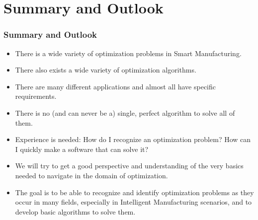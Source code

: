 \documentclass[mathserif]{beamer}%
\begin{document}
\section{Summary and Outlook}%
%
\begin{frame}%
\frametitle{Summary and Outlook}%
%
\begin{itemize}%
\item There is a wide variety of optimization problems in Smart Manufacturing.%
\item<2-> There also exists a wide variety of optimization algorithms.%
\item<3-> There are many different applications and almost all have specific requirements.%
\item<4-> There is no (and can never be a) single, perfect algorithm to solve all of them.\cite{WM1995NFLTFS,WM1997NFLTFO,AT2009CLAFPTDOOOA,AT2010CLAFPTDOOOA}%
\item<5-> Experience is needed: How do I recognize an optimization problem? How can I quickly make a software that can solve it?%
\item<6-> We will try to get a good perspective and understanding of the very basics needed to navigate in the domain of optimization.%
\item<7-> The goal is to be able to recognize and identify optimization problems as they occur in many fields, especially in Intelligent Manufacturing scenarios, and to develop basic algorithms to solve them.%
\end{itemize}%
%
\end{frame}%
%
\endPresentation%
\end{document}
